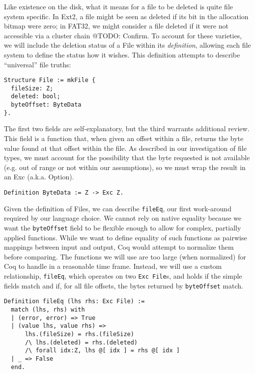 \documentclass[nocopyrightspace]{sigplanconf}
\begin{document}
Like existence on the disk, what it means for a file to be deleted is quite
file system specific. In Ext2, a file might be seen as deleted if its bit in
the allocation bitmap were zero; in FAT32, we might consider a file deleted if
it were not accessible via a cluster chain @TODO: Confirm. To account for
these varieties, we will include the deletion status of a File within its {\em
definition}, allowing each file system to define the status how it wishes.
This definition attempts to describe ``universal'' file truths:

\begin{lstlisting}
Structure File := mkFile {
  fileSize: Z;
  deleted: bool;
  byteOffset: ByteData
}.
\end{lstlisting}

The first two fields are self-explanatory, but the third warrants additional
review. This field is a function that, when given an offset within a file,
returns the byte value found at that offset within the file. As described in
our investigation of file types, we must account for the possibility that the
byte requested is not available (e.g. out of range or not within our
assumptions), so we must wrap the result in an Exc (a.k.a. Option).

\begin{lstlisting}
Definition ByteData := Z -> Exc Z.
\end{lstlisting}

Given the definition of Files, we can describe {\tt fileEq}, our first
work-around required by our language choice. We cannot rely on native equality
because we want the {\tt byteOffset} field to be flexible enough to allow for
complex, partially applied functions. While we want to define equality of such
functions as pairwise mappings between input and output, Coq would attempt to
normalize them before comparing. The functions we will use are too large (when
normalized) for Coq to handle in a reasonable time frame. Instead, we will use
a custom relationship, {\tt fileEq}, which operates on two {\tt Exc File}s,
and holds if the simple fields match and if, for all file offsets, the bytes
returned by {\tt byteOffset} match.

\begin{lstlisting}
Definition fileEq (lhs rhs: Exc File) :=
  match (lhs, rhs) with
  | (error, error) => True
  | (value lhs, value rhs) =>
      lhs.(fileSize) = rhs.(fileSize)
      /\ lhs.(deleted) = rhs.(deleted)
      /\ forall idx:Z, lhs @[ idx ] = rhs @[ idx ]
  | _ => False
  end.
\end{lstlisting}
\end{document}
